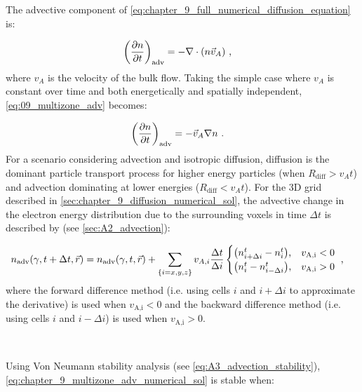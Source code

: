 The advective component of \autoref{eq:chapter_9_full_numerical_diffusion_equation} is:

\begin{equation}
    \begin{aligned}
    \qty(\pdv{n}{t})_\text{adv}&=-\nabla\cdot\qty(n\vec{v}_A)\text{ ,} 
    \end{aligned} \label{eq:09_multizone_adv}
\end{equation}
\noindent where $v_A$ is the velocity of the bulk flow. Taking the simple case where $v_A$ is constant over time and both energetically and spatially independent, \autoref{eq:09_multizone_adv} becomes:

\begin{equation}
    \begin{aligned}
    \qty(\pdv{n}{t})_\text{adv}&=-\vec{v}_A\nabla n\text{ .} 
    \end{aligned} \label{eq:chapter_9_advection_component}
\end{equation}
\noindent For a scenario considering advection and isotropic diffusion, diffusion is the dominant particle transport process for higher energy particles (when $R_\text{diff}>v_At$) and advection dominating at lower energies ($R_\text{diff}<v_At$). For the 3D grid described in \autoref{sec:chapter_9_diffusion_numerical_sol}, the advective change in the electron energy distribution due to the surrounding voxels in time $\Delta t$ is described by (see \autoref{sec:A2_advection}):

\begin{equation}
    \begin{aligned}
        n_\text{adv}\qty(\gamma,t+\Delta t,\vec{r})&=n_\text{adv}\qty(\gamma,t,\vec{r})+\sum_\qty{i=x,y,z}v_{A,i}\frac{\Delta t}{\Delta i}
        \begin{cases}
            \qty(n_{i+\Delta i}^t-n_{i}^t)\text{,}& v_\text{A,i}<0 \\
            \qty(n_{i}^t-n_{i-\Delta i}^t)\text{,}& v_\text{A,i}>0
        \end{cases} \text{ ,}
    \end{aligned} \label{eq:chapter_9_multizone_adv_numerical_sol}
\end{equation}
\noindent where the forward difference method (i.e. using cells $i$ and $i+\Delta i$ to approximate the derivative) is used when $v_\text{A,i}<0$ and the backward difference method (i.e. using cells $i$ and $i-\Delta i$) is used when $v_\text{A,i}>0$. 
\par~\par 
Using Von Neumann stability analysis (see \autoref{eq:A3_advection_stability}), \autoref{eq:chapter_9_multizone_adv_numerical_sol} is stable when:

